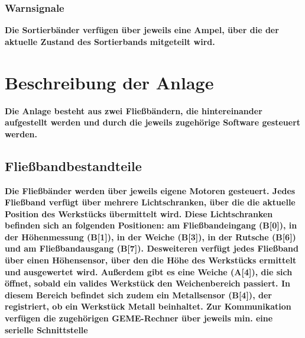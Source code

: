 \documentclass[oneside,a4paper,titlepage]{scrartcl} %
\begin{document}
\subsubsection{Warnsignale}
\textbf{Die Sortierbänder verfügen über jeweils eine Ampel, über die der aktuelle Zustand des Sortierbands mitgeteilt wird.}

\newpage

\section{Beschreibung der Anlage}
\textbf{Die Anlage besteht aus zwei Fließbändern, die hintereinander aufgestellt werden und durch die jeweils zugehörige Software gesteuert werden.}
\subsection{Fließbandbestandteile}
\textbf{Die Fließbänder werden über jeweils eigene Motoren gesteuert. \newline
Jedes Fließband verfügt über mehrere Lichtschranken, über die die aktuelle Position des Werkstücks übermittelt wird. Diese Lichtschranken befinden sich an folgenden Positionen: am Fließbandeingang (B[0]), in der Höhenmessung (B[1]), in der Weiche (B[3]), in der Rutsche (B[6]) und am Fließbandausgang (B[7]). \newline
Desweiteren verfügt jedes Fließband über einen Höhensensor, über den die Höhe des Werkstücks ermittelt und ausgewertet wird. \newline
Außerdem gibt es eine Weiche (A[4]), die sich öffnet, sobald ein valides Werkstück den Weichenbereich passiert. In diesem Bereich befindet sich zudem ein Metallsensor (B[4]), der registriert, ob ein Werkstück Metall beinhaltet.\newline
Zur Kommunikation verfügen die zugehörigen GEME-Rechner über jeweils min. eine serielle Schnittstelle\newline }
\end{document}
